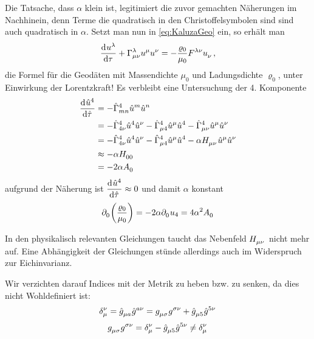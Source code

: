 Die Tatsache, dass $\alpha$ klein ist, legitimiert
die zuvor gemachten Näherungen im Nachhinein, denn Terme die quadratisch in den
Christoffelsymbolen sind sind auch quadratisch in $\alpha$.
Setzt man nun in \eqref{eq:KaluzaGeo} ein, so erhält man
\begin{equation}
\dod{\tensor{u}{^\lambda}}{\tau}
+\tensor*{\Gamma}{^\lambda_\mu_\nu}\tensor{u}{^\mu}\tensor{u}{^\nu}
=-\frac{\varrho_0}{\mu_0}\tensor{F}{^\lambda^\nu}\tensor{u}{_\nu}\, ,
\end{equation}
die Formel für die Geodäten mit Massendichte $\mu_0$ und Ladungsdichte
$\varrho_0$, unter Einwirkung der Lorentzkraft! Es verbleibt eine
Untersuchung der 4. Komponente
\begin{equation}
\begin{split}
\dod{\tensor{\hat{u}}{^4}}{\hat{\tau}}
&=
-\tensor*{\hat{\Gamma}}{^4_m_n}\tensor{\hat{u}}{^m}\tensor{\hat{u}}{^n}\\
&=
-\tensor*{\hat{\Gamma}}{^4_4_\nu}\tensor{\hat{u}}{^4}\tensor{\hat{u}}{^\nu}
-\tensor*{\hat{\Gamma}}{^4_\mu_4}\tensor{\hat{u}}{^\mu}\tensor{\hat{u}}{^4}
-\tensor*{\hat{\Gamma}}{^4_\mu_\nu}\tensor{\hat{u}}{^\mu}\tensor{\hat{u}}{^\nu}\\
&=
-\tensor*{\hat{\Gamma}}{^4_4_\nu}\tensor{\hat{u}}{^4}\tensor{\hat{u}}{^\nu}
-\tensor*{\hat{\Gamma}}{^4_\mu_4}\tensor{\hat{u}}{^\mu}\tensor{\hat{u}}{^4}
-\alpha\tensor{H}{_\mu_\nu}\tensor{\hat{u}}{^\mu}\tensor{\hat{u}}{^\nu}\\
&\approx
-\alpha\tensor{H}{_0_0}\\
&=
-2\alpha\tensor{A}{_0}\\
\end{split}
\end{equation}
aufgrund der Näherung ist $\dod{\tensor{\hat{u}}{^4}}{\hat{\tau}}\approx 0$ und
damit $\alpha$ konstant
\begin{equation}
\begin{split}
\tensor{\partial}{_0}\left(\frac{\varrho_0}{\mu_0}\right)
=-2\alpha\tensor{\partial}{_0}u_4=
4\alpha^2\tensor{A}{_0}
\end{split}
\end{equation}
\begin{bemerkung}
In den physikalisch relevanten Gleichungen taucht das Nebenfeld
$\tensor{H}{_\mu_\nu}$ nicht mehr auf. Eine Abhängigkeit der Gleichungen stünde
allerdings auch im Widerspruch zur Eichinvarianz.
\end{bemerkung}
\begin{bemerkung}
Wir verzichten darauf Indices mit der Metrik zu heben bzw. zu senken, da dies
nicht Wohldefiniert ist:
\begin{equation}
\tensor*{\delta}{*_\mu^\nu}=\tensor{\hat{g}}{_\mu_a}\tensor{\hat{g}}{^a^\nu}
=\tensor{g}{_\mu_\sigma}\tensor{g}{^\sigma^\nu}+\tensor{\hat{g}}{_\mu_5}\tensor{\hat{g}}{^5^\nu}
\end{equation}
\begin{equation}
\tensor{g}{_\mu_\sigma}\tensor{g}{^\sigma^\nu}
=\tensor*{\delta}{*_\mu^\nu}-\tensor{\hat{g}}{_\mu_5}\tensor{\hat{g}}{^5^\nu}\neq\tensor*{\delta}{*_\mu^\nu}
\end{equation}
\end{bemerkung}
